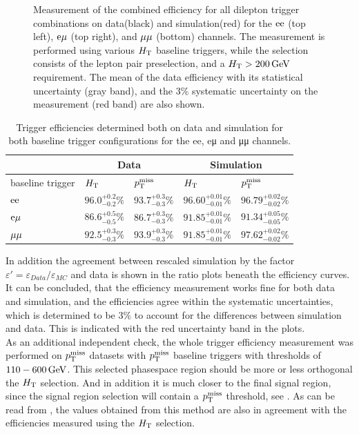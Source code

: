 \begin{figure}[htb]
 \caption{Measurement of the combined efficiency for all dilepton trigger combinations on data(black) and simulation(red) for the $\mathrm{e}\mathrm{e}$ (top left), $\mathrm{e}\mu$ (top right), and $\mu\mu$ (bottom) channels. The measurement is performed using various $H_{\mathrm{T}}$ baseline triggers, while the selection consists of the lepton pair preselection, and a $H_{\mathrm{T}}>200\,\text{Ge\hspace{-.08em}V}$ requirement. The mean of the data efficiency with its statistical uncertainty (gray band), and the $3\%$ systematic uncertainty on the measurement (red band) are also shown.}
 \label{fig:triggEff}
\end{figure}


\begin{table}[htb]
 \centering
 \caption{Trigger efficiencies determined both on data and simulation for both baseline trigger
  configurations for the ee, eμ and μμ channels.}
 \label{tab:triggEff}
 \begin{tabular}{lllll}
                   & \multicolumn{2}{c}{Data} & \multicolumn{2}{c}{Simulation}                                                         \\\hline
  baseline trigger & $H_{\mathrm{T}}$                    & $p_{\mathrm{T}}^\text{miss}$                      & $H_{\mathrm{T}}$                     & $p_{\mathrm{T}}^\text{miss}$                 \\\hline
  $\mathrm{e}\mathrm{e}$         & $96.0^{+0.2}_{-0.2}\%$   & $93.7^{+0.3}_{-0.3}\%$         & $96.60^{+0.01}_{-0.01}\%$ & $96.79^{+0.02}_{-0.02}\%$ \\
  $\mathrm{e}{\mu}$        & $86.6^{+0.5}_{-0.5}\%$   & $86.7^{+0.3}_{-0.3}\%$         & $91.85^{+0.01}_{-0.01}\%$ & $91.34^{+0.05}_{-0.05}\%$ \\
  ${\mu}{\mu}$       & $92.5^{+0.3}_{-0.3}\%$   & $93.9^{+0.3}_{-0.3}\%$         & $91.85^{+0.01}_{-0.01}\%$ & $97.62^{+0.02}_{-0.02}\%$ \\\hline
 \end{tabular}
\end{table}


In addition the agreement between rescaled simulation by the factor $\varepsilon'=\varepsilon_{Data}/\varepsilon_{MC}$ and data is shown in the ratio plots beneath the efficiency curves. It can be concluded, that the efficiency measurement works fine for both data and simulation, and the efficiencies agree within the systematic uncertainties, which is determined to be $3\%$ to account for the differences between simulation and data. This is indicated with the red uncertainty band in the plots.\\
As an additional independent check, the whole trigger efficiency measurement was performed on $p_{\mathrm{T}}^\text{miss}$ datasets with $p_{\mathrm{T}}^\text{miss}$ baseline triggers with thresholds of $110-600\,\text{Ge\hspace{-.08em}V}$. This selected phasespace region should be more or less orthogonal the $H_{\mathrm{T}}$ selection. And in addition it is much closer to the final signal region, since the signal region selection will contain a $p_{\mathrm{T}}^\text{miss}$ threshold, see . As can be read from , the values obtained from this method are also in agreement with the efficiencies measured using the $H_{\mathrm{T}}$ selection.
